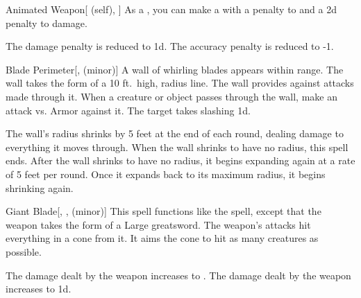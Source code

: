 \lowercase{\hypertarget{spell:Animated Weapon}{}}\label{spell:Animated Weapon}
\begin{attuneability}[Rank 4]{\hypertarget{spell:Animated Weapon}{Animated Weapon}}[ (self), ]
As a , you can make a  with a  penalty to  and a \minus2d penalty to damage.

\rankline
{} The damage penalty is reduced to \minus1d.
 The accuracy penalty is reduced to -1.
\end{attuneability}
\vspace{0.25em}



\lowercase{\hypertarget{spell:Blade Perimeter}{}}\label{spell:Blade Perimeter}
\begin{freeability}[Rank 4]{\hypertarget{spell:Blade Perimeter}{Blade Perimeter}}[,  (minor)]
A wall of whirling blades appears within \rngmed range.
The wall takes the form of a 10 ft.\ high, \areamed radius line.
The wall provides  against attacks made through it.
When a creature or object passes through the wall, make an attack vs. Armor against it.
\hit The target takes slashing  \minus1d.

\rankline
{} The wall's radius shrinks by 5 feet at the end of each round, dealing damage to everything it moves through.
When the wall shrinks to have no radius, this spell ends.
 After the wall shrinks to have no radius, it begins expanding again at a rate of 5 feet per round.
Once it expands back to its maximum radius, it begins shrinking again.
\end{freeability}
\vspace{0.25em}



\lowercase{\hypertarget{spell:Giant Blade}{}}\label{spell:Giant Blade}
\begin{freeability}[Rank 4]{\hypertarget{spell:Giant Blade}{Giant Blade}}[, ,  (minor)]
This spell functions like the  spell, except that the weapon takes the form of a Large greatsword.
The weapon's attacks hit everything in a \areasmall cone from it.
It aims the cone to hit as many creatures as possible.

\rankline
{} The damage dealt by the weapon increases to .
 The damage dealt by the weapon increases to  \plus1d.
\end{freeability}
\vspace{0.25em}



